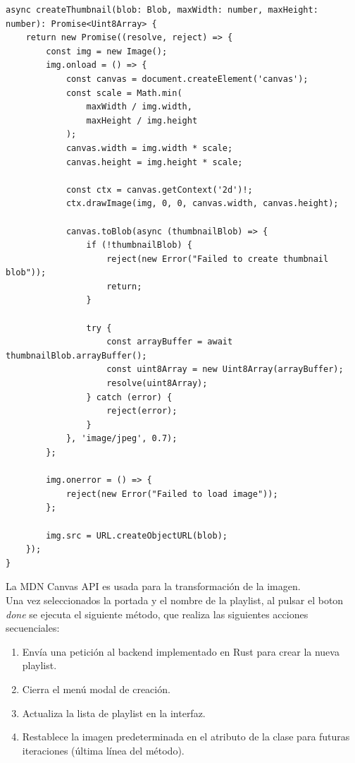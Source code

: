 \documentclass[11pt, a4paper]{article}
\begin{document}
                \begin{lstlisting}[caption={createThumbnail()}]
async createThumbnail(blob: Blob, maxWidth: number, maxHeight: number): Promise<Uint8Array> {
    return new Promise((resolve, reject) => {
        const img = new Image();
        img.onload = () => {
            const canvas = document.createElement('canvas');
            const scale = Math.min(
                maxWidth / img.width,
                maxHeight / img.height
            );
            canvas.width = img.width * scale;
            canvas.height = img.height * scale;
            
            const ctx = canvas.getContext('2d')!;
            ctx.drawImage(img, 0, 0, canvas.width, canvas.height);
            
            canvas.toBlob(async (thumbnailBlob) => {
                if (!thumbnailBlob) {
                    reject(new Error("Failed to create thumbnail blob"));
                    return;
                }
                
                try {
                    const arrayBuffer = await thumbnailBlob.arrayBuffer();
                    const uint8Array = new Uint8Array(arrayBuffer);
                    resolve(uint8Array);
                } catch (error) {
                    reject(error);
                }
            }, 'image/jpeg', 0.7);
        };
        
        img.onerror = () => {
            reject(new Error("Failed to load image"));
        };
        
        img.src = URL.createObjectURL(blob);
    });
}
                \end{lstlisting}

                La MDN Canvas API es usada para la transformación de la imagen. \\

                Una vez seleccionados la portada y el nombre de la playlist, al pulsar el boton \textit{done} se ejecuta el siguiente método, que realiza las siguientes acciones secuenciales:

                \begin{enumerate}
                    \item Envía una petición al backend implementado en Rust para crear la nueva playlist.
                    \item Cierra el menú modal de creación.
                    \item Actualiza la lista de playlist en la interfaz.
                    \item Restablece la imagen predeterminada en el atributo de la clase para futuras iteraciones (última línea del método).
                \end{enumerate}
\end{document}
